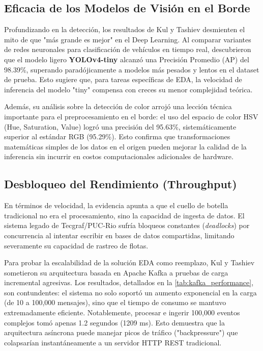 \subsection{Eficacia de los Modelos de Visión en el Borde}
Profundizando en la detección, los resultados de Kul y Tashiev \cite{kul2021microservices} desmienten el mito de que "más grande es mejor" en el Deep Learning. Al comparar variantes de redes neuronales para clasificación de vehículos en tiempo real, descubrieron que el modelo ligero \textbf{YOLOv4-tiny} alcanzó una Precisión Promedio (AP) del 98.39\%, superando paradójicamente a modelos más pesados y lentos en el dataset de prueba. Esto sugiere que, para tareas específicas de EDA, la velocidad de inferencia del modelo "tiny" compensa con creces su menor complejidad teórica.

Además, su análisis sobre la detección de color arrojó una lección técnica importante para el preprocesamiento en el borde: el uso del espacio de color HSV (Hue, Saturation, Value) logró una precisión del 95.63\%, sistemáticamente superior al estándar RGB (95.29\%). Esto confirma que transformaciones matemáticas simples de los datos en el origen pueden mejorar la calidad de la inferencia sin incurrir en costos computacionales adicionales de hardware.

\subsection{Desbloqueo del Rendimiento (Throughput)}
En términos de velocidad, la evidencia apunta a que el cuello de botella tradicional no era el procesamiento, sino la capacidad de ingesta de datos. El sistema legado de Tecgraf/PUC-Rio \cite{laigner2020monolithic} sufría bloqueos constantes (\textit{deadlocks}) por concurrencia al intentar escribir en bases de datos compartidas, limitando severamente su capacidad de rastreo de flotas.

Para probar la escalabilidad de la solución EDA como reemplazo, Kul y Tashiev \cite{kul2021microservices} sometieron su arquitectura basada en Apache Kafka a pruebas de carga incremental agresivas. Los resultados, detallados en la \cref{tab:kafka_performance}, son contundentes: el sistema no solo soportó un aumento exponencial en la carga (de 10 a 100,000 mensajes), sino que el tiempo de consumo se mantuvo extremadamente eficiente. Notablemente, procesar e ingerir 100,000 eventos complejos tomó apenas 1.2 segundos (1209 ms). Esto demuestra que la arquitectura asíncrona puede manejar picos de tráfico ("backpressure") que colapsarían instantáneamente a un servidor HTTP REST tradicional.

